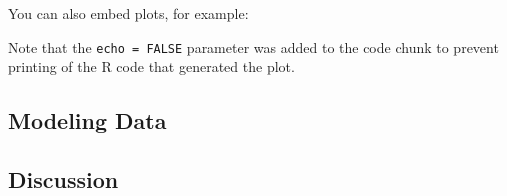 \documentclass[
]{article}
\begin{document}
You can also embed plots, for example:

Note that the \texttt{echo\ =\ FALSE} parameter was added to the code
chunk to prevent printing of the R code that generated the plot.

\hypertarget{modeling-data}{%
\subsection{Modeling Data}\label{modeling-data}}

\hypertarget{discussion}{%
\subsection{Discussion}\label{discussion}}
\end{document}
